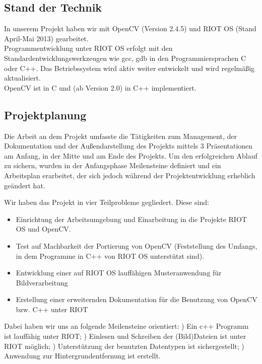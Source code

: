 \documentclass[10pt,a4paper]{article}
\begin{document}
\subsection{Stand der Technik}

In unserem Projekt haben wir mit OpenCV (Version 2.4.5) und RIOT OS (Stand April-Mai 2013) gearbeitet.  \\

Programmentwicklung unter RIOT OS erfolgt mit den Standardentwicklungswerkzeugen wie gcc, gdb in den Programmiersprachen C oder C++. Das Betriebssystem wird aktiv weiter entwickelt und wird regelmäßig aktualisiert. \\

OpenCV ist in C und (ab Version 2.0) in C++ implementiert.

\subsection{Projektplanung}

Die Arbeit an dem Projekt umfasste die Tätigkeiten zum Management, der Dokumentation und der Außendarstellung des Projekts mittels 3 Präsentationen am Anfang, in der Mitte und am Ende des Projekts. Um den erfolgreichen Ablauf zu sichern, wurden in der Anfangsphase Meilensteine definiert und ein Arbeitsplan erarbeitet, der sich jedoch während der Projektentwicklung erheblich geändert hat. 

Wir haben das Projekt in vier Teilprobleme gegliedert. Diese sind:
\begin{itemize}
\item Einrichtung der Arbeitsumgebung und Einarbeitung in die Projekte RIOT OS und OpenCV.
\item Test auf Machbarkeit der Portierung von OpenCV (Feststellung des Umfangs, in dem Programme in C++ von RIOT OS unterstützt sind).
\item Entwicklung einer auf RIOT OS lauffähigen Musteranwendung für Bildverarbeitung
\item Erstellung einer erweiternden Dokumentation für die Benutzung von OpenCV bzw. C++ unter RIOT
\end{itemize}

Dabei haben wir uns an folgende Meilensteine orientiert: ) Ein c++ Programm ist lauffähig unter RIOT; ) Einlesen und Schreiben der (Bild)Dateien ist unter RIOT möglich; ) Unterstützung der benutzten Datentypen ist sichergestellt; ) Anwendung zur Hintergrundentfernung ist erstellt. \newline
\end{document}

